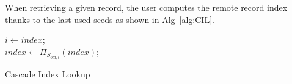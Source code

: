 \documentclass[USenglish,oneside,twocolumn]{article}
\begin{document}
When retrieving a given record, the user computes the remote record index  thanks to the last used seeds as shown in Alg~\ref{alg:CIL}.\\

\begin{algorithm}
\DontPrintSemicolon
{}
$i \gets index$;\\
{
	$index \gets {\Pi}_{S_{old, i}}(index) $;\\
}
\caption{Cascade Index Lookup}
\label{alg:CIL}
\end{algorithm}
\end{document}
